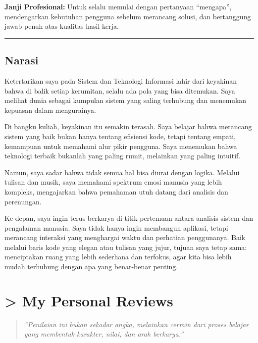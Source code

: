 \documentclass[
  letterpaper,
  DIV=11,
  numbers=noendperiod]{scrreprt}
\begin{document}
\textbf{Janji Profesional:} Untuk selalu memulai dengan pertanyaan
``mengapa'', mendengarkan kebutuhan pengguna sebelum merancang solusi,
dan bertanggung jawab penuh atas kualitas hasil kerja.

\begin{center}\rule{0.5\linewidth}{0.5pt}\end{center}

\section{Narasi}\label{narasi}

Ketertarikan saya pada Sistem dan Teknologi Informasi lahir dari
keyakinan bahwa di balik setiap kerumitan, selalu ada pola yang bisa
ditemukan. Saya melihat dunia sebagai kumpulan sistem yang saling
terhubung dan menemukan kepuasan dalam mengurainya.

Di bangku kuliah, keyakinan itu semakin terasah. Saya belajar bahwa
merancang sistem yang baik bukan hanya tentang efisiensi kode, tetapi
tentang empati, kemampuan untuk memahami alur pikir pengguna. Saya
menemukan bahwa teknologi terbaik bukanlah yang paling rumit, melainkan
yang paling intuitif.

Namun, saya sadar bahwa tidak semua hal bisa diurai dengan logika.
Melalui tulisan dan musik, saya memahami spektrum emosi manusia yang
lebih kompleks, mengajarkan bahwa pemahaman utuh datang dari analisis
dan perenungan.

Ke depan, saya ingin terus berkarya di titik pertemuan antara analisis
sistem dan pengalaman manusia. Saya tidak hanya ingin membangun
aplikasi, tetapi merancang interaksi yang menghargai waktu dan perhatian
penggunanya. Baik melalui baris kode yang elegan atau tulisan yang
jujur, tujuan saya tetap sama: menciptakan ruang yang lebih sederhana
dan terfokus, agar kita bisa lebih mudah terhubung dengan apa yang
benar-benar penting.


\chapter{\textgreater{} My Personal Reviews}\label{my-personal-reviews}

\begin{quote}
\emph{``Penilaian ini bukan sekadar angka, melainkan cermin dari proses
belajar yang membentuk karakter, nilai, dan arah berkarya.''}
\end{quote}
\end{document}
